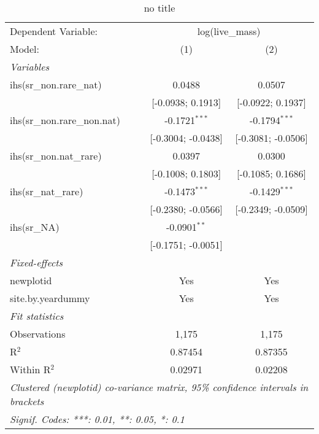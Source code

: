 
\begin{table}[htbp]
   \caption{no title}
   \centering
   \begin{tabular}{lcc}
      \tabularnewline \midrule \midrule
      Dependent Variable: & \multicolumn{2}{c}{log(live\_mass)}\\
      Model:                       & (1)                & (2)\\  
      \midrule
      \emph{Variables}\\
      ihs(sr\_non.rare\_nat)       & 0.0488             & 0.0507\\   
                                   & [-0.0938; 0.1913]  & [-0.0922; 0.1937]\\   
      ihs(sr\_non.rare\_non.nat)   & -0.1721$^{***}$    & -0.1794$^{***}$\\   
                                   & [-0.3004; -0.0438] & [-0.3081; -0.0506]\\   
      ihs(sr\_non.nat\_rare)       & 0.0397             & 0.0300\\   
                                   & [-0.1008; 0.1803]  & [-0.1085; 0.1686]\\   
      ihs(sr\_nat\_rare)           & -0.1473$^{***}$    & -0.1429$^{***}$\\   
                                   & [-0.2380; -0.0566] & [-0.2349; -0.0509]\\   
      ihs(sr\_NA)                  & -0.0901$^{**}$     &   \\   
                                   & [-0.1751; -0.0051] &   \\   
      \midrule
      \emph{Fixed-effects}\\
      newplotid                    & Yes                & Yes\\  
      site.by.yeardummy            & Yes                & Yes\\  
      \midrule
      \emph{Fit statistics}\\
      Observations                 & 1,175              & 1,175\\  
      R$^2$                        & 0.87454            & 0.87355\\  
      Within R$^2$                 & 0.02971            & 0.02208\\  
      \midrule \midrule
      \multicolumn{3}{l}{\emph{Clustered (newplotid) co-variance matrix, 95\% confidence intervals in brackets}}\\
      \multicolumn{3}{l}{\emph{Signif. Codes: ***: 0.01, **: 0.05, *: 0.1}}\\
   \end{tabular}
\end{table}


